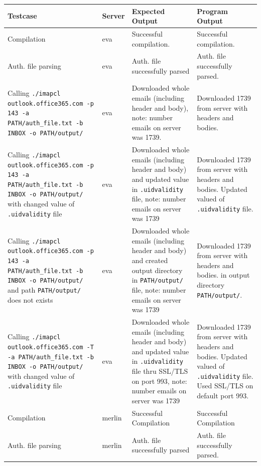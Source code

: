 \documentclass[a4paper,11pt]{article}
\begin{document}
\begin{center}
    \vspace{0.5cm} %
    \begin{tabularx}{\textwidth}{|>{\raggedright\arraybackslash}p{5cm}|>{\raggedright\arraybackslash}p{1cm}|>{\raggedright\arraybackslash}p{5cm}|>{\raggedright\arraybackslash}X|}
        \hline
        \textbf{Testcase} & \textbf{Server} & \textbf{Expected Output} & \textbf{Program Output} \\
        \hline
        Compilation & eva & Successful compilation. & Successful compilation. \\
        \hline
        Auth. file parsing & eva & Auth. file successfully parsed & Auth. file successfully parsed. \\
        \hline
        Calling \texttt{./imapcl outlook.office365.com -p 143 -a PATH/auth\_file.txt -b INBOX -o PATH/output/} & eva & Downloaded whole emails (including header and body), note: number emails on server was 1739. & Downloaded 1739 from server with headers and bodies. \\
        \hline
        Calling \texttt{./imapcl outlook.office365.com -p 143 -a PATH/auth\_file.txt -b INBOX -o PATH/output/} with changed value of \texttt{.uidvalidity} file & eva & Downloaded whole emails (including header and body) and updated value in \texttt{.uidvalidity} file, note: number emails on server was 1739 & Downloaded 1739 from server with headers and bodies. Updated valued of \texttt{.uidvalidity} file. \\
        \hline
        Calling \texttt{./imapcl outlook.office365.com -p 143 -a PATH/auth\_file.txt -b INBOX -o PATH/output/} and path \texttt{PATH/output/} does not exists & eva & Downloaded whole emails (including header and body) and created output directory in \texttt{PATH/output/} file, note: number emails on server was 1739 & Downloaded 1739 from server with headers and bodies. in output directory \texttt{PATH/output/}. \\
        \hline
        Calling \texttt{./imapcl outlook.office365.com -T -a PATH/auth\_file.txt -b INBOX -o PATH/output/} with changed value of \texttt{.uidvalidity} file & eva & Downloaded whole emails (including header and body) and updated value in \texttt{.uidvalidity} file thru SSL/TLS on port 993, note: number emails on server was 1739 & Downloaded 1739 from server with headers and bodies. Updated valued of \texttt{.uidvalidity} file. Used SSL/TLS on default port 993.\\
        \hline
        Compilation & merlin & Successful Compilation & Successful Compilation \\
        \hline
        Auth. file parsing & merlin & Auth. file successfully parsed & Auth. file successfully parsed. \\
        \hline
    \end{tabularx}
    \vspace{0.5cm} %
\end{center}
\end{document}
